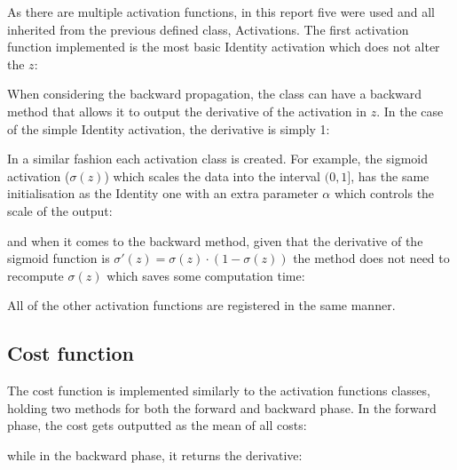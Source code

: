 \documentclass{report}
\begin{document}


As there are multiple activation functions, in this report five were used and all inherited from the previous defined class, Activations. The first activation function implemented is the most basic Identity activation which does not alter the $z$:



When considering the backward propagation, the class can have a backward method that allows it to output the derivative of the activation in $z$. In the case of the simple Identity activation, the derivative is simply 1:



In a similar fashion each activation class is created. For example, the sigmoid activation ($\sigma(z)$) which scales the data into the interval $(0,1]$, has the same initialisation as the Identity one with an extra parameter $\alpha$ which controls the scale of the output:



and when it comes to the backward method, given that the derivative of the sigmoid function is $\sigma'(z)=\sigma(z)\cdot (1-\sigma(z))$ the method does not need to recompute $\sigma(z)$ which saves some computation time:




All of the other activation functions are registered in the same manner.

\subsection{Cost function}
The cost function is implemented similarly to the activation functions classes, holding two methods for both the forward and backward phase. In the forward phase, the cost gets outputted as the mean of all costs:



while in the backward phase, it returns the derivative:


\end{document}
